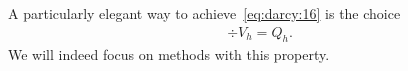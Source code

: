 \begin{remark}
  A particularly elegant way to achieve~\eqref{eq:darcy:16} is the
  choice
  \begin{gather}
    \label{eq:darcy:17}
    \div V_h = Q_h.
  \end{gather}
  We will indeed focus on methods with this property.
\end{remark}


